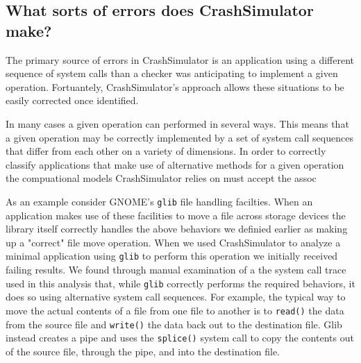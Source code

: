         
\subsection{What sorts of errors does CrashSimulator make?}
\label{sec-sorts-errors}
%
The primary source of %
errors in CrashSimulator is an
application using a different sequence of system calls than a checker was
anticipating to implement a given operation.  Fortuantely, CrashSimulator's
approach allows these situations to be easily corrected once identified.

In many cases a given operation can performed in several ways.  This means that
a given operation may be correctly implemented by a set of system call sequences
that differ from each other on a variety of dimensions.  In order to correctly
classify applications that make use of alternative methods for a given operation
the compuational models CrashSimulator relies on must accept the assoc

As an example consider GNOME's {\tt glib} file handling facilties.  When an
application makes use of these facilities to move a file across storage devices
the library itself correctly handles the above behaviors we definied earlier as
making up a "correct" file move operation.  When we used CrashSimulator to
analyze a minimal application using {\tt glib} to perform this operation we
initially received failing results.  We found through manual examination of a
the system call trace used in this analysis that, while {\tt glib} correctly performs
the required behaviors, it does so using alternative system call sequences.  For
example, the typical way to move the actual contents of a file from one file to
another is to {\tt read()} the data from the source file and {\tt write()} the
data back out to the destination file.  Glib instead creates a pipe and uses the
{\tt splice()} system call to copy the contents out of the source file, through
the pipe, and into the destination file.


